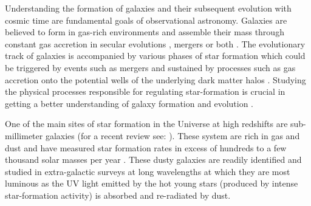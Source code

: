 \documentclass[iop,apj,useAMS,usenatbib]{emulateapj-rtx4}
\begin{document}
Understanding the formation of galaxies and their subsequent evolution with cosmic time
are fundamental goals of observational astronomy. Galaxies are believed
to form in gas-rich environments \citep{Dekel2009} and assemble their
mass through constant gas accretion in secular evolutions
\citep{Dekel2009, Kruijssen2014, Narayanan2015}, mergers \citep{Kauffmann1993,
  Hopkins2008, Tacconi2008, Engel2010, Hopkins2013} or both \citep{Kormendy2004,
  Genzel2008, Barro2013}. The evolutionary track of
galaxies is accompanied by various phases of star formation which
could be triggered by events such as mergers and sustained by
processes such as gas accretion onto the potential wells of the
underlying dark matter halos \citep{Cole1994, Granato2004, Bower2006,
  Furlong2015}. Studying the physical processes responsible for
regulating star-formation is crucial in getting a better
understanding of galaxy formation and evolution \citep{Law2009,
  Hemmati2014, Hemmati2015}.

One of the main sites of star formation in the Universe at high
redshifts are sub-millimeter galaxies (for a recent review see:
\citealp{Casey2014}). These system are rich in gas
and dust and have measured star formation rates in
excess of hundreds to a few thousand solar masses per year \citep{Greve2005, Capak2008,
  Magnelli2012, Michalowski2016}. These dusty galaxies are readily
identified and studied in extra-galactic surveys at long wavelengths
\citep{Blain1999, Elbaz2011, Leroy2013, Scoville2016, Hemmati2017} at which they are most
luminous as the UV light emitted by the hot young stars
(produced by intense star-formation activity) is absorbed and re-radiated by dust.
\end{document}
